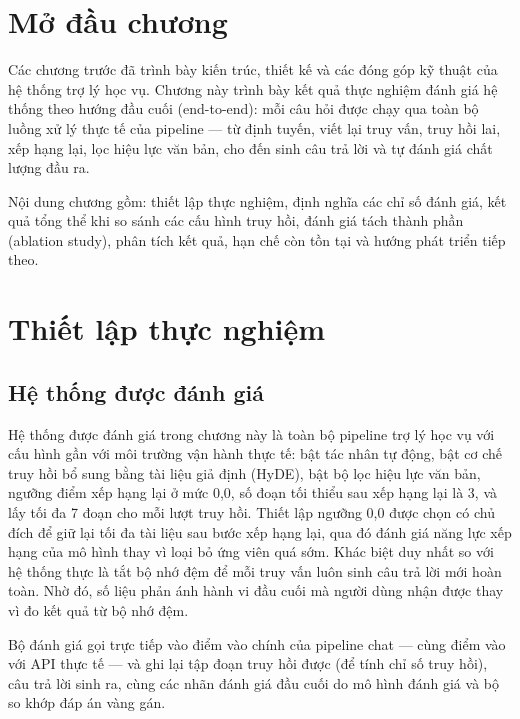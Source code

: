 \documentclass[../DoAn.tex]{subfiles}
\begin{document}
\section{Mở đầu chương}

Các chương trước đã trình bày kiến trúc, thiết kế và các đóng góp kỹ thuật của
hệ thống trợ lý học vụ. Chương này trình bày kết quả thực nghiệm đánh giá hệ
thống theo hướng đầu cuối (end-to-end): mỗi câu hỏi được chạy qua toàn bộ luồng
xử lý thực tế của pipeline --- từ định tuyến, viết lại truy vấn, truy hồi lai,
xếp hạng lại, lọc hiệu lực văn bản, cho đến sinh câu trả lời và tự đánh giá
chất lượng đầu ra.

Nội dung chương gồm: thiết lập thực nghiệm, định nghĩa các chỉ số đánh giá, kết
quả tổng thể khi so sánh các cấu hình truy hồi, đánh giá tách thành phần
(ablation study), phân tích kết quả, hạn chế còn tồn tại và hướng phát triển
tiếp theo.

\section{Thiết lập thực nghiệm}

\subsection{Hệ thống được đánh giá}

Hệ thống được đánh giá trong chương này là toàn bộ pipeline trợ lý học vụ với
cấu hình gần với môi trường vận hành thực tế: bật tác nhân tự động, bật cơ chế
truy hồi bổ sung bằng tài liệu giả định (HyDE), bật bộ lọc hiệu lực văn bản,
ngưỡng điểm xếp hạng lại ở mức 0,0, số đoạn tối thiểu sau xếp hạng lại là 3,
và lấy tối đa 7 đoạn cho mỗi lượt truy hồi. Thiết lập ngưỡng 0,0 được chọn có
chủ đích để giữ lại tối đa tài liệu sau bước xếp hạng lại, qua đó đánh giá năng
lực xếp hạng của mô hình thay vì loại bỏ ứng viên quá sớm. Khác biệt duy nhất
so với hệ thống thực là tắt bộ nhớ đệm để mỗi truy vấn luôn sinh câu trả lời
mới hoàn toàn. Nhờ đó, số liệu phản ánh hành vi đầu cuối mà người dùng nhận
được thay vì đo kết quả từ bộ nhớ đệm.

Bộ đánh giá gọi trực tiếp vào điểm vào chính của pipeline chat --- cùng điểm vào
với API thực tế --- và ghi lại tập đoạn truy hồi được (để tính chỉ số truy hồi),
câu trả lời sinh ra, cùng các nhãn đánh giá đầu cuối do mô hình đánh giá và bộ
so khớp đáp án vàng gán.
\end{document}
